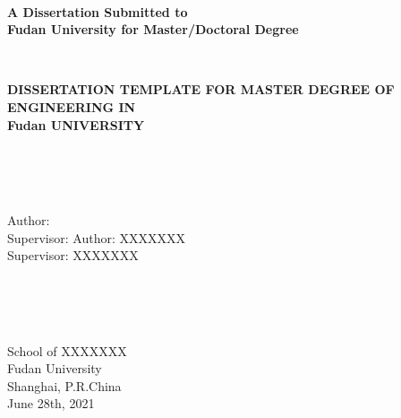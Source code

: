 \newpage
\thispagestyle{empty}
~\\
\begin{center}
\textbf{
A Dissertation Submitted to \\
Fudan  University for Master/Doctoral Degree}
\end{center}
~\\
\begin{center}
\textbf{
DISSERTATION TEMPLATE FOR MASTER DEGREE OF ENGINEERING IN \\
Fudan  UNIVERSITY}
\end{center}
~\\
~\\
~\\
\begin{center}
\ifreview
Author:  \\   %
Supervisor:    %
\else
Author:  XXXXXXX\\
Supervisor:   XXXXXXX
\fi
\end{center}
~\\
~\\
~\\
\begin{center}
School of XXXXXXX \\
Fudan  University \\
Shanghai, P.R.China \\
June 28th, 2021  
\end{center}

\newpage